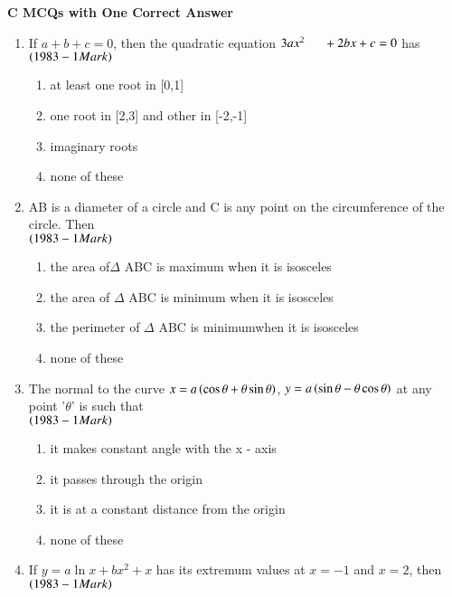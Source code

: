 \documentclass[journal,12pt,twocolumn]{IEEEtran}
\theoremstyle{remark}
\begin{document}
\indent\hspace{0.3cm}\textbf{C MCQs with One Correct Answer}\\
\begin{enumerate}
\item If $a+b+c = 0$, then the quadratic equation $3ax^2 \indent + 2bx + c = 0$ 
has\hfill$\left(1983 - 1 Mark\right)$
\begin{enumerate}[label=\alph*.]
	\item at least one root in [0,1]
	\item one root in [2,3] and other in [-2,-1]
        \item imaginary roots
	\item none of these\\
\end{enumerate}
\item AB is a diameter of a circle and C is any point \indent on the
circumference of the circle. Then\\ \indent\hfill
$\left(1983 - 1 Mark\right)$
\begin{enumerate}[label=\alph*.]
	\item the area of$\Delta$ ABC is maximum when it is isosceles
	\item the area of $\Delta$ ABC is minimum when it is isosceles
	\item the perimeter of $\Delta$ ABC is minimumwhen it is isosceles
	\item none of these\\
\end{enumerate}
\item The normal to the curve $x = a\left(\cos \theta + \theta\sin \theta\right)$,
	\indent $y = a\left(\sin \theta - \theta\cos \theta\right)$
at any point '$\theta$' 
is such that\\\indent\hfill$\left(1983 - 1 Mark\right)$
\begin{enumerate}[label=\alph*.]
	\item it makes  constant angle with the x - axis
	\item it passes through the origin
	\item it is at a constant distance from the origin
	\item none of these\\
\end{enumerate}
\item If $y=a\ln x + bx^2 +x$ has its extremum values at \indent $x = -1$
and $x = 2$, then\hfill$\left(1983 - 1 Mark\right)$
\begin{enumerate}[label=\alph*.]
\begin{multicols}{2}

\end{multicols}
\end{enumerate}
\end{enumerate}
\end{document}
